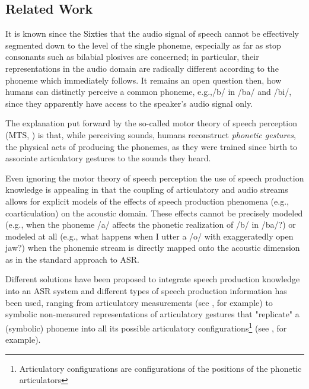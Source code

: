 \subsection{Related Work}

It is known since the Sixties \cite{liberman1} that the audio signal of speech
cannot be effectively segmented down to the level of the single phoneme,
especially as far as stop consonants such as bilabial plosives
are concerned; in particular, their representations in the audio domain are
radically different according to the phoneme which immediately follows.
It remains an open question then, how humans can
distinctly perceive a common phoneme, e.g.,/b/ in  /ba/ and /bi/, since they
apparently have access to the speaker's audio signal only.

The explanation put forward by the so-called motor theory of speech perception
(MTS, \cite{liberman2,galant}) is that, while perceiving sounds,
humans reconstruct \emph{phonetic gestures}, the physical acts of
producing the phonemes, as they were trained since birth to associate
articulatory gestures to the sounds they heard. 

Even ignoring the motor theory of speech perception the use of speech production knowledge is appealing in that the coupling of articulatory and audio streams allows for explicit models of the effects of speech production phenomena (e.g., coarticulation) on the acoustic domain. These effects cannot be precisely modeled (e.g., when the phoneme /a/ affects the phonetic realization of /b/ in /ba/?)  or modeled at all (e.g., what happens when I utter a /o/ with exaggeratedly open jaw?) when the phonemic stream is directly mapped onto the acoustic dimension as in the standard approach to ASR.  

Different solutions have been proposed to integrate speech production knowledge into an ASR system and different types of speech production information has been used, ranging from articulatory measurements (see \cite{zlokarnik,stephenson,wrench}, for example) to symbolic non-measured representations of articulatory gestures that "replicate" a (symbolic) phoneme into all its possible articulatory configurations\footnote{Articulatory configurations are configurations of the positions of the phonetic articulators} (see \cite{richardson, livescu}, for example).
 
   

